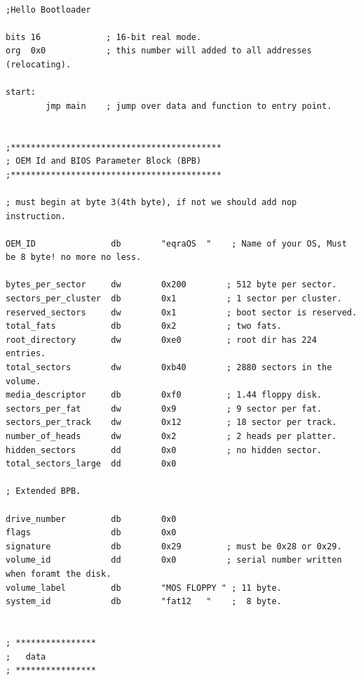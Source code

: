 \documentclass[document.tex]{subfiles}
\begin{document}
\begin{english}

\lstset{numberstyle=\tiny,numbers=left,stepnumber=1,numbersep=5pt,tabsize=2,extendedchars=true,breaklines=true,frame=b,showspaces=false, showtabs=false,xleftmargin=10pt,framexleftmargin=10pt,framexrightmargin=5pt,framexbottommargin=4pt,showstringspaces=false,language=[x86masm]Assembler}

\begin{lstlisting}[label=lst:bpb_bootloader,caption=\en{BPB example}]

;Hello Bootloader

bits 16				; 16-bit real mode.
org	 0x0			; this number will added to all addresses (relocating).

start:
		jmp main	; jump over data and function to entry point.
		
		
;******************************************
; OEM Id and BIOS Parameter Block (BPB) 
;******************************************

; must begin at byte 3(4th byte), if not we should add nop instruction.

OEM_ID               db        "eqraOS  "    ; Name of your OS, Must be 8 byte! no more no less.

bytes_per_sector     dw        0x200		; 512 byte per sector.
sectors_per_cluster  db        0x1          ; 1 sector per cluster.
reserved_sectors     dw        0x1          ; boot sector is reserved.
total_fats           db        0x2          ; two fats.
root_directory       dw        0xe0         ; root dir has 224 entries.
total_sectors        dw        0xb40        ; 2880 sectors in the volume.
media_descriptor     db        0xf0         ; 1.44 floppy disk.
sectors_per_fat      dw        0x9          ; 9 sector per fat.
sectors_per_track    dw        0x12         ; 18 sector per track.
number_of_heads      dw        0x2          ; 2 heads per platter.
hidden_sectors       dd        0x0          ; no hidden sector.
total_sectors_large  dd        0x0

; Extended BPB.

drive_number         db        0x0
flags                db        0x0
signature            db        0x29         ; must be 0x28 or 0x29.
volume_id            dd        0x0          ; serial number written when foramt the disk.
volume_label         db        "MOS FLOPPY " ; 11 byte.
system_id            db        "fat12   "    ;  8 byte.


; ****************
;	data
; ****************


\end{lstlisting}
\end{english}
\end{document}
